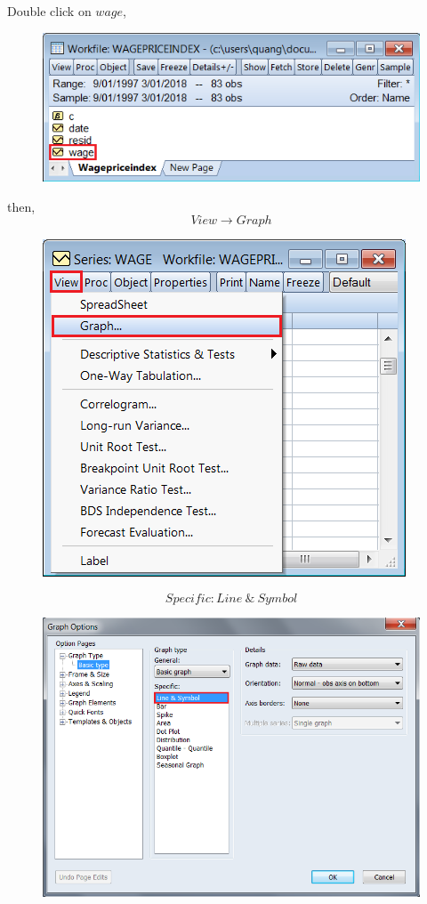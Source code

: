 \documentclass[12pt]{report}
\begin{document}
\noindent Double click on $wage$,
\begin{figure}[H]
	\centerline{\includegraphics{2018sem2_q2_2}}
\end{figure}
\vspace{-\baselineskip} \noindent then, $$View \to Graph$$
\begin{figure}[H]
	\centerline{\includegraphics{2018sem2_q2_3}}
\end{figure}
\vspace{-\baselineskip} $$Specific: Line\ \&\ Symbol$$
\begin{figure}[H]
	\centerline{\includegraphics{2018sem2_q2_4}}
\end{figure}
\end{document}
